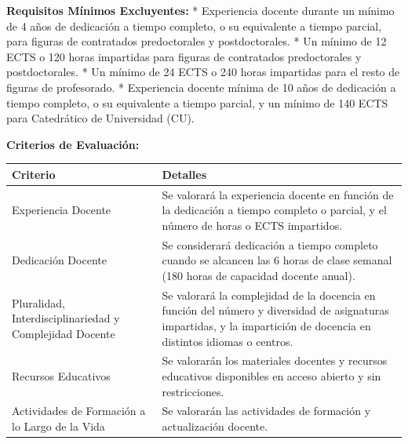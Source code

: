 \documentclass{article}
\begin{document}
\begin{itemize}
\begin{itemize}
                \textbf{Requisitos Mínimos Excluyentes:}
                * Experiencia docente durante un mínimo de 4 años de dedicación a tiempo completo, o su equivalente a tiempo parcial, para figuras de contratados predoctorales y postdoctorales.
                * Un mínimo de 12 ECTS o 120 horas impartidas para figuras de contratados predoctorales y postdoctorales.
                * Un mínimo de 24 ECTS o 240 horas impartidas para el resto de figuras de profesorado.
                * Experiencia docente mínima de 10 años de dedicación a tiempo completo, o su equivalente a tiempo parcial, y un mínimo de 140 ECTS para Catedrático de Universidad (CU).

                \textbf{Criterios de Evaluación:}
                \vspace{0.4cm}
                \begin{table}[h!]\centering\renewcommand{\arraystretch}{1.3}
                  \begin{tabular}{|p{}|p{}|}\hline
                    Criterio                                                & Detalles                                                                                                                                                             \\\hline
                    Experiencia Docente                                     & Se valorará la experiencia docente en función de la dedicación a tiempo completo o parcial, y el número de horas o ECTS impartidos.                                  \\\hline
                    Dedicación Docente                                      & Se considerará dedicación a tiempo completo cuando se alcancen las 6 horas de clase semanal (180 horas de capacidad docente anual).                                  \\\hline
                    Pluralidad, Interdisciplinariedad y Complejidad Docente & Se valorará la complejidad de la docencia en función del número y diversidad de asignaturas impartidas, y la impartición de docencia en distintos idiomas o centros. \\\hline
                    Recursos Educativos                                     & Se valorarán los materiales docentes y recursos educativos disponibles en acceso abierto y sin restricciones.                                                        \\\hline
                    Actividades de Formación a lo Largo de la Vida          & Se valorarán las actividades de formación y actualización docente.                                                                                                   \\\hline

\end{tabular}
\end{table}
\end{itemize}
\end{itemize}
\end{document}
